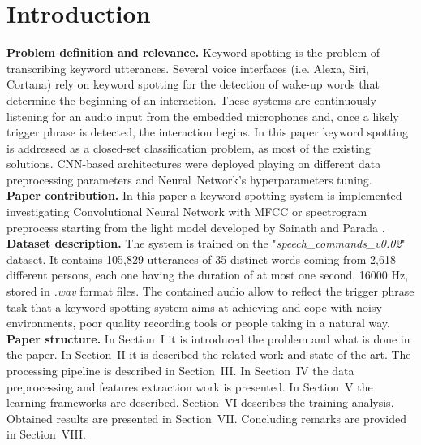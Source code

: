 
\section{Introduction}
\label{sec:introduction}
\noindent \textbf{Problem definition and relevance.} Keyword spotting is the problem of transcribing keyword utterances. Several voice interfaces (i.e. Alexa, Siri, Cortana) rely on keyword spotting for the detection of wake-up words that determine the beginning of an interaction. These systems are continuously listening for an audio input from the embedded microphones and, once a likely trigger phrase is detected, the interaction begins. 
In this paper keyword spotting is addressed as a closed-set classification problem, as most of the existing solutions. CNN-based architectures were deployed playing on different data preprocessing parameters and \mbox{Neural Network's} hyperparameters tuning.\\

\noindent \textbf{Paper contribution.} In this paper a keyword spotting system is implemented investigating Convolutional Neural Network with MFCC or spectrogram preprocess starting from the light model developed by Sainath and Parada \cite{sainath2015convolutional}.\\

\noindent \textbf{Dataset description.} \cite{Warden-2018} The system is trained on the \mbox{"{\it speech\_commands\_v0.02}"} dataset. It contains 105,829 utterances of 35 distinct words coming from 2,618 different persons, each one having the duration of at most one second, 16000 Hz, stored in {\it .wav} format files. The contained audio allow to reflect the trigger phrase task that a keyword spotting system aims at achieving and cope with noisy environments, poor quality recording tools or people taking in a natural way. \\ 

\noindent \textbf{Paper structure.} In Section~I it is introduced the problem and what is done in the paper. In Section~II it is described the related work and state of the art. The processing pipeline is described in Section~III. In Section~IV the data preprocessing and features extraction work is presented. In Section~V the learning frameworks are described. Section~VI describes the training analysis. Obtained results are presented in Section~VII.  Concluding remarks are provided in Section~VIII.

